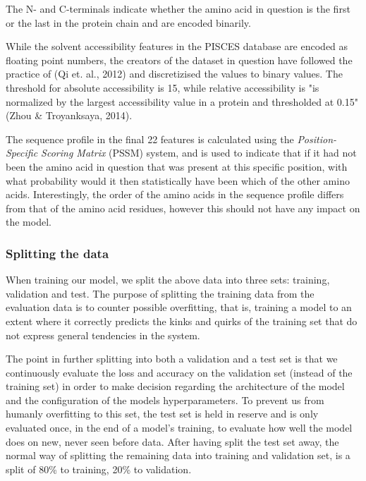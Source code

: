 \begin{multicols}{2}
\noindent The N- and C-terminals indicate whether the amino acid in question is the first or the last in the protein chain and are encoded binarily.

While the solvent accessibility features in the PISCES database are encoded as floating point numbers, the creators of the dataset in question have followed the practice of (Qi et. al., 2012) and discretizised the values to binary values. The threshold for absolute accessibility is 15, while relative accessibility is "is normalized by the largest accessibility value in a protein and thresholded at 0.15" (Zhou \& Troyanksaya, 2014).

The sequence profile in the final 22 features is calculated using the \textit{Position-Specific Scoring Matrix} (PSSM) system, and is used to indicate that if it had not been the amino acid in question that was present at this specific position, with what probability would it then statistically have been which of the other amino acids. Interestingly, the order of the amino acids in the sequence profile differs from that of the amino acid residues, however this should not have any impact on the model.


\subsubsection{Splitting the data}
When training our model, we split the above data into three sets: training, validation and test. The purpose of splitting the training data from the evaluation data is to counter possible overfitting, that is, training a model to an extent where it correctly predicts the kinks and quirks of the training set that do not express general tendencies in the system.

The point in further splitting into both a validation and a test set is that we continuously evaluate the loss and accuracy on the validation set (instead of the training set) in order to make decision regarding the architecture of the model and the configuration of the models hyperparameters. To prevent us from humanly overfitting to this set, the test set is held in reserve and is only evaluated once, in the end of a model's training, to evaluate how well the model does on new, never seen before data. After having split the test set away, the normal way of splitting the remaining data into training and validation set, is a split of 80\% to training, 20\% to validation. \citep[p. 119]{goodfellow-et-al-2016}


\end{multicols}
